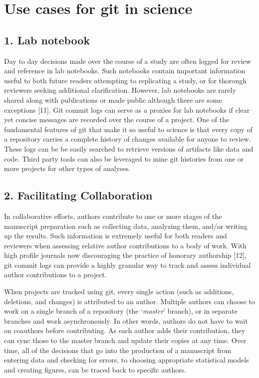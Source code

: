 \documentclass[]{article}
\begin{document}
\section{Use cases for git in science}

\subsection{1. Lab notebook}

Day to day decisions made over the course of a study are often logged
for review and reference in lab notebooks. Such notebooks contain
important information useful to both future readers attempting to
replicating a study, or for thorough reviewers seeking additional
clarification. However, lab notebooks are rarely shared along with
publications or made public although there are some exceptions {[}11{]}.
Git commit logs can serve as a proxies for lab notebooks if clear yet
concise messages are recorded over the course of a project. One of the
fundamental features of git that make it so useful to science is that
every copy of a repository carries a complete history of changes
available for anyone to review. These logs can be be easily searched to
retrieve versions of artifacts like data and code. Third party tools can
also be leveraged to mine git histories from one or more projects for
other types of analyses.

\subsection{2. Facilitating Collaboration}

In collaborative efforts, authors contribute to one or more stages of
the manuscript preparation such as collecting data, analyzing them,
and/or writing up the results. Such information is extremely useful for
both readers and reviewers when assessing relative author contributions
to a body of work. With high profile journals now discouraging the
practice of honorary authorship {[}12{]}, git commit logs can provide a
highly granular way to track and assess individual author contributions
to a project.

When projects are tracked using git, every single action (such as
additions, deletions, and changes) is attributed to an author. Multiple
authors can choose to work on a single branch of a repository (the
`\emph{master}' branch), or in separate branches and work
asynchronously. In other words, authors do not have to wait on coauthors
before contributing. As each author adds their contribution, they can
sync those to the master branch and update their copies at any time.
Over time, all of the decisions that go into the production of a
manuscript from entering data and checking for errors, to choosing
appropriate statistical models and creating figures, can be traced back
to specific authors.
\end{document}
